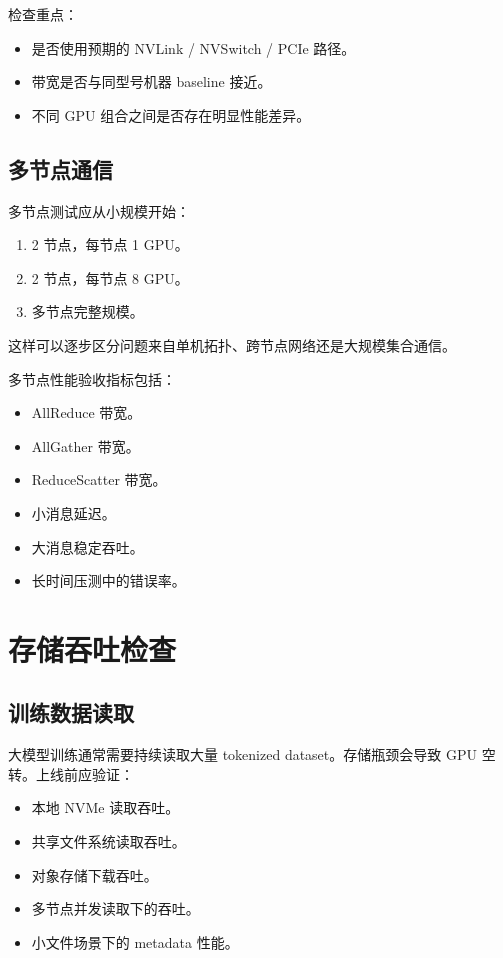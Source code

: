 检查重点：

\begin{itemize}
\item 是否使用预期的 NVLink / NVSwitch / PCIe 路径。
\item 带宽是否与同型号机器 baseline 接近。
\item 不同 GPU 组合之间是否存在明显性能差异。
\end{itemize}

\subsection{多节点通信}

多节点测试应从小规模开始：

\begin{enumerate}
\item 2 节点，每节点 1 GPU。
\item 2 节点，每节点 8 GPU。
\item 多节点完整规模。
\end{enumerate}

这样可以逐步区分问题来自单机拓扑、跨节点网络还是大规模集合通信。

多节点性能验收指标包括：

\begin{itemize}
\item AllReduce 带宽。
\item AllGather 带宽。
\item ReduceScatter 带宽。
\item 小消息延迟。
\item 大消息稳定吞吐。
\item 长时间压测中的错误率。
\end{itemize}

\section{存储吞吐检查}

\subsection{训练数据读取}

大模型训练通常需要持续读取大量 tokenized dataset。存储瓶颈会导致 GPU 空转。上线前应验证：

\begin{itemize}
\item 本地 NVMe 读取吞吐。
\item 共享文件系统读取吞吐。
\item 对象存储下载吞吐。
\item 多节点并发读取下的吞吐。
\item 小文件场景下的 metadata 性能。
\end{itemize}

